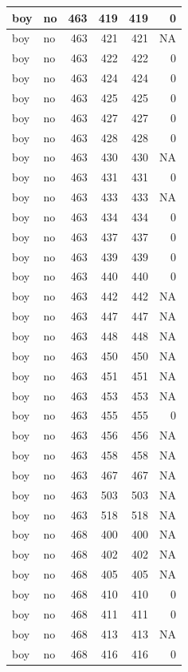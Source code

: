 \documentclass[man]{apa6}
\begin{document}
\begin{tabular}{l|l|r|r|r|r}
\hline
boy & no & 463 & 419 & 419 & 0\\
\hline
boy & no & 463 & 421 & 421 & NA\\
\hline
boy & no & 463 & 422 & 422 & 0\\
\hline
boy & no & 463 & 424 & 424 & 0\\
\hline
boy & no & 463 & 425 & 425 & 0\\
\hline
boy & no & 463 & 427 & 427 & 0\\
\hline
boy & no & 463 & 428 & 428 & 0\\
\hline
boy & no & 463 & 430 & 430 & NA\\
\hline
boy & no & 463 & 431 & 431 & 0\\
\hline
boy & no & 463 & 433 & 433 & NA\\
\hline
boy & no & 463 & 434 & 434 & 0\\
\hline
boy & no & 463 & 437 & 437 & 0\\
\hline
boy & no & 463 & 439 & 439 & 0\\
\hline
boy & no & 463 & 440 & 440 & 0\\
\hline
boy & no & 463 & 442 & 442 & NA\\
\hline
boy & no & 463 & 447 & 447 & NA\\
\hline
boy & no & 463 & 448 & 448 & NA\\
\hline
boy & no & 463 & 450 & 450 & NA\\
\hline
boy & no & 463 & 451 & 451 & NA\\
\hline
boy & no & 463 & 453 & 453 & NA\\
\hline
boy & no & 463 & 455 & 455 & 0\\
\hline
boy & no & 463 & 456 & 456 & NA\\
\hline
boy & no & 463 & 458 & 458 & NA\\
\hline
boy & no & 463 & 467 & 467 & NA\\
\hline
boy & no & 463 & 503 & 503 & NA\\
\hline
boy & no & 463 & 518 & 518 & NA\\
\hline
boy & no & 468 & 400 & 400 & NA\\
\hline
boy & no & 468 & 402 & 402 & NA\\
\hline
boy & no & 468 & 405 & 405 & NA\\
\hline
boy & no & 468 & 410 & 410 & 0\\
\hline
boy & no & 468 & 411 & 411 & 0\\
\hline
boy & no & 468 & 413 & 413 & NA\\
\hline
boy & no & 468 & 416 & 416 & 0\\

\end{tabular}
\end{document}

